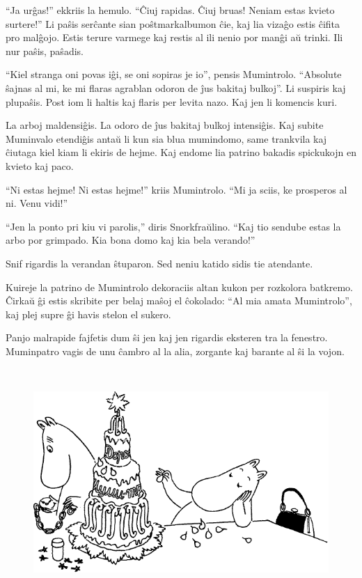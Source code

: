 ``Ja urĝas!'' ekkriis la hemulo. ``Ĉiuj rapidas. Ĉiuj bruas! Neniam estas kvieto surtere!'' Li paŝis serĉante sian poŝtmarkalbumon ĉie, kaj lia vizaĝo estis ĉifita pro malĝojo. Estis terure varmege kaj restis al ili nenio por manĝi aŭ trinki. Ili nur paŝis, paŝadis.

``Kiel stranga oni povas iĝi, se oni sopiras je io'', pensis Mumintrolo. ``Absolute ŝajnas al mi, ke mi flaras agrablan odoron de ĵus bakitaj bulkoj''. Li suspiris kaj plupaŝis. Post iom li haltis kaj flaris per levita nazo. Kaj jen li komencis kuri.

La arboj maldensiĝis. La odoro de ĵus bakitaj bulkoj intensiĝis. Kaj subite Muminvalo etendiĝis antaŭ li kun sia blua mumindomo, same trankvila kaj ĉiutaga kiel kiam li ekiris de hejme. Kaj endome lia patrino bakadis spickukojn en kvieto kaj paco.

``Ni estas hejme! Ni estas hejme!'' kriis Mumintrolo. ``Mi ja sciis, ke prosperos al ni. Venu vidi!''

``Jen la ponto pri kiu vi parolis,'' diris Snorkfraŭlino. ``Kaj tio sendube estas la arbo por grimpado. Kia bona domo kaj kia bela verando!''

Snif rigardis la verandan ŝtuparon. Sed neniu katido sidis tie atendante.

Kuireje la patrino de Mumintrolo dekoraciis altan kukon per rozkolora batkremo. Ĉirkaŭ ĝi estis skribite per belaj maŝoj el ĉokolado: ``Al mia amata Mumintrolo'', kaj plej supre ĝi havis stelon el sukero.

Panjo malrapide fajfetis dum ŝi jen kaj jen rigardis eksteren tra la fenestro. Muminpatro vagis de unu ĉambro al la alia, zorgante kaj barante al ŝi la vojon.

\begin{figure}[htbp]
\centering
\includegraphics[width=400pt,height=245pt]{9-1.png}
\caption{}
\label{9-1}
\end{figure}

